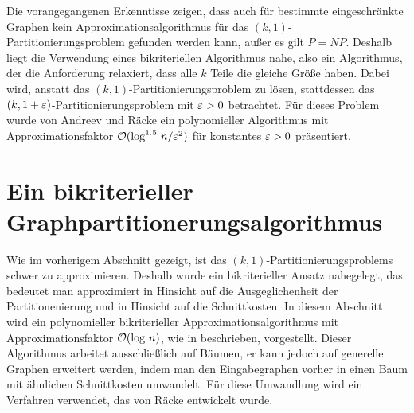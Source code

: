 Die vorangegangenen Erkenntisse zeigen, dass auch für bestimmte eingeschränkte Graphen kein Approximationsalgorithmus für das $(k,1)$-Partitionierungsproblem gefunden werden kann, außer es gilt $P=NP$. 
Deshalb liegt die Verwendung eines bikriteriellen Algorithmus nahe, also ein Algorithmus, der die Anforderung relaxiert, dass alle $k$ Teile die gleiche Größe haben.
Dabei wird, anstatt das $(k,1)$-Partitionierungsproblem zu lösen, stattdessen das $(k,1+\varepsilon)$-Partitionierungsproblem mit $\varepsilon > 0$ betrachtet.
Für dieses Problem wurde von Andreev und Räcke ein polynomieller Algorithmus mit Approximationsfaktor $\mathcal{O}(\log^{1.5}\, n / \varepsilon^2)$ für konstantes $\varepsilon > 0$ präsentiert. \parencite{ar06} 

\section{Ein bikriterieller Graphpartitionerungsalgorithmus}
Wie im vorherigem Abschnitt gezeigt, ist das $(k,1)$-Partitionierungsproblems schwer zu approximieren. 
Deshalb wurde ein bikriterieller Ansatz nahegelegt, das bedeutet man approximiert in Hinsicht auf die Ausgeglichenheit der Partitionenierung und in Hinsicht auf die Schnittkosten.
In diesem Abschnitt wird ein polynomieller bikriterieller Approximationsalgorithmus mit Approximationsfaktor $\mathcal{O}(\log\, n)$, wie in \parencite{ff13} beschrieben, vorgestellt.
Dieser Algorithmus arbeitet ausschließlich auf Bäumen, er kann jedoch auf generelle Graphen erweitert werden, indem man den Eingabegraphen vorher in einen Baum mit ähnlichen Schnittkosten umwandelt.
Für diese Umwandlung wird ein Verfahren verwendet, das von Räcke entwickelt wurde. \parencite{rc08}

